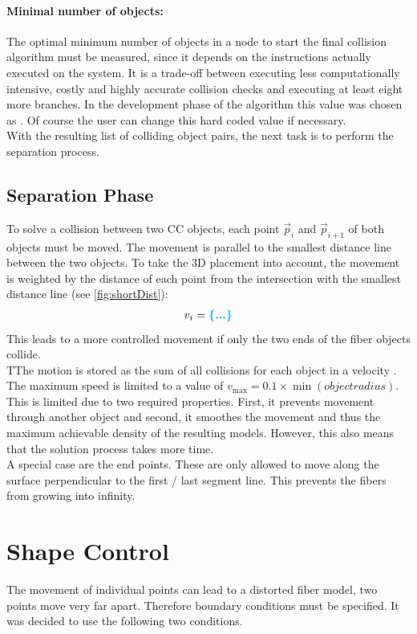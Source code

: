 \paragraph{Minimal number of objects:}
The optimal minimum number of objects in a node to start the final collision algorithm must be measured, since it depends on the instructions actually executed on the system.
It is a trade-off between executing less computationally intensive, costly and highly accurate collision checks and executing at least eight more branches.
In the development phase of the algorithm this value was chosen as .
Of course the user can change this hard coded value if necessary. 
\\
% 
With the resulting list of colliding object pairs, the next task is to perform the separation process.
%
\subsection{Separation Phase}
To solve a collision between two \ac{CC} objects, each point $\vec{p}_i$ and $\vec{p}_{i+1}$ of both objects must be moved.
The movement is parallel to the smallest distance line between the two objects.
To take the 3D placement into account, the movement is weighted by the distance of each point from the intersection with the smallest distance line (see \cref{fig:shortDist}):
\begin{align}
v_i = \dummy{}
\end{align}
This leads to a more controlled movement if \eg{} only the two ends of the fiber objects collide.
\\
% 
TThe motion is stored as the sum of all collisions for each object in a velocity .
The maximum speed is limited to a value of $v_{\max} = 0.1 \times \min(\mathit{object radius})$.
This is limited due to two required properties. First, it prevents movement through another object and second, it smoothes the movement and thus the maximum achievable density of the resulting models.
However, this also means that the solution process takes more time.
\\
% 
A special case are the end points.
These are only allowed to move along the surface perpendicular to the first / last segment line.
This prevents the fibers from growing into infinity.
% 
\section{Shape Control}\label{chap5:ShapeControl}
The movement of individual points can lead to a distorted fiber model, \eg{} two points move very far apart.
Therefore boundary conditions must be specified.
It was decided to use the following two conditions.
% 
